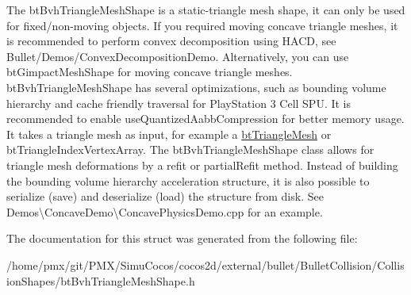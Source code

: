 The bt\+Bvh\+Triangle\+Mesh\+Shape is a static-\/triangle mesh shape, it can only be used for fixed/non-\/moving objects. If you required moving concave triangle meshes, it is recommended to perform convex decomposition using H\+A\+CD, see Bullet/\+Demos/\+Convex\+Decomposition\+Demo. Alternatively, you can use bt\+Gimpact\+Mesh\+Shape for moving concave triangle meshes. bt\+Bvh\+Triangle\+Mesh\+Shape has several optimizations, such as bounding volume hierarchy and cache friendly traversal for Play\+Station 3 Cell S\+PU. It is recommended to enable use\+Quantized\+Aabb\+Compression for better memory usage. It takes a triangle mesh as input, for example a \hyperlink{classbtTriangleMesh}{bt\+Triangle\+Mesh} or bt\+Triangle\+Index\+Vertex\+Array. The bt\+Bvh\+Triangle\+Mesh\+Shape class allows for triangle mesh deformations by a refit or partial\+Refit method. Instead of building the bounding volume hierarchy acceleration structure, it is also possible to serialize (save) and deserialize (load) the structure from disk. See Demos\textbackslash{}\+Concave\+Demo\textbackslash{}\+Concave\+Physics\+Demo.\+cpp for an example. 

The documentation for this struct was generated from the following file\+:\begin{DoxyCompactItemize}
\item 
/home/pmx/git/\+P\+M\+X/\+Simu\+Cocos/cocos2d/external/bullet/\+Bullet\+Collision/\+Collision\+Shapes/bt\+Bvh\+Triangle\+Mesh\+Shape.\+h\end{DoxyCompactItemize}
